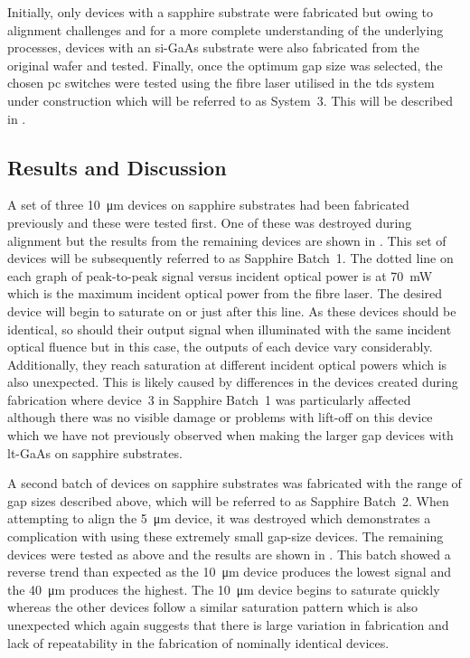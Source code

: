 Initially, only devices with a sapphire substrate were fabricated but owing to alignment challenges and for a more complete understanding of the underlying processes, devices with an \acrshort{si}\nobreakdash-GaAs substrate were also fabricated from the original wafer and tested. Finally, once the optimum gap size was selected, the chosen \acrshort{pc} switches were tested using the fibre laser utilised in the \acrshort{tds} system under construction which will be referred to as System~3. This will be described in .

\subsection{Results and Discussion}
A set of three \SI{10}{\micro\metre} devices on sapphire substrates had been fabricated previously and these were tested first. One of these was destroyed during alignment but the results from the remaining devices are shown in . This set of devices will be subsequently referred to as Sapphire Batch~1. The dotted line on each graph of peak\nobreakdash-to\nobreakdash-peak signal versus incident optical power is at \SI{70}{mW} which is the maximum incident optical power from the fibre laser. The desired device will begin to saturate on or just after this line. As these devices should be identical, so should their output signal when illuminated with the same incident optical fluence but in this case, the outputs of each device vary considerably. Additionally, they reach saturation at different incident optical powers which is also unexpected. This is likely caused by differences in the devices created during fabrication where device~3 in Sapphire Batch~1 was particularly affected although there was no visible damage or problems with lift\nobreakdash-off on this device which we have not previously observed when making the larger gap devices with \acrshort{lt}\nobreakdash-GaAs on sapphire substrates.

A second batch of devices on sapphire substrates was fabricated with the range of gap sizes described above, which will be referred to as Sapphire Batch~2. When attempting to align the \SI{5}{\micro\metre} device, it was destroyed which demonstrates a complication with using these extremely small gap\nobreakdash-size devices. The remaining devices were tested as above and the results are shown in . This batch showed a reverse trend than expected as the \SI{10}{\micro\metre} device produces the lowest signal and the \SI{40}{\micro\metre} produces the highest. The \SI{10}{\micro\metre} device begins to saturate quickly whereas the other devices follow a similar saturation pattern which is also unexpected which again suggests that there is large variation in fabrication and lack of repeatability in the fabrication of nominally identical devices.

